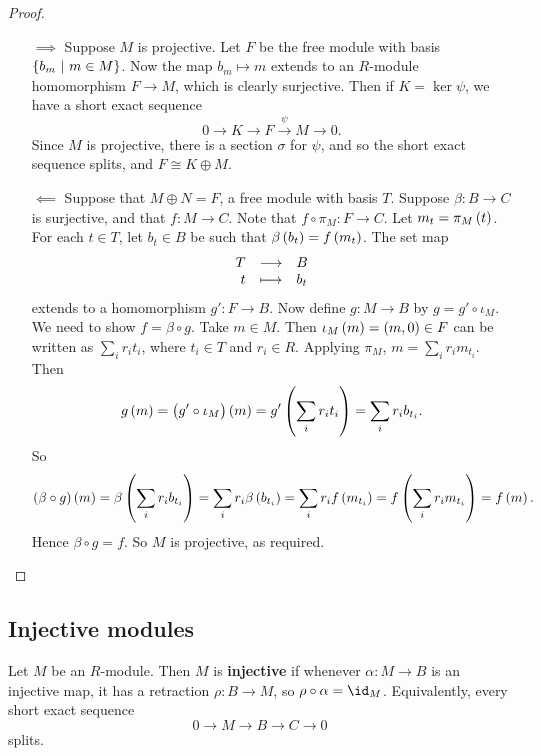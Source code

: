 \begin{proof}
\hfill
\begin{itemize}
\item[$ \implies $] Suppose $ M $ is projective. Let $ F $ be the free module with basis $ \cbr{b_m \st m \in M} $. Now the map $ b_m \mapsto m $ extends to an $ R $-module homomorphism $ F \to M $, which is clearly surjective. Then if $ K = \ker \psi $, we have a short exact sequence
$$ 0 \to K \to F \xrightarrow{\psi} M \to 0. $$
Since $ M $ is projective, there is a section $ \sigma $ for $ \psi $, and so the short exact sequence splits, and $ F \cong K \oplus M $.


\item[$ \impliedby $] Suppose that $ M \oplus N = F $, a free module with basis $ T $. Suppose $ \beta : B \to C $ is surjective, and that $ f : M \to C $. Note that $ f \circ \pi_M : F \to C $. Let $ m_t = \pi_M\br{t} $. For each $ t \in T $, let $ b_t \in B $ be such that $ \beta\br{b_t} = f\br{m_t} $. The set map
$$ \function{T}{B}{t}{b_t} $$
extends to a homomorphism $ g' : F \to B $. Now define $ g : M \to B $ by $ g = g' \circ \iota_M $. We need to show $ f = \beta \circ g $. Take $ m \in M $. Then $ \iota_M\br{m} = \br{m, 0} \in F $ can be written as $ \sum_i r_it_i $, where $ t_i \in T $ and $ r_i \in R $. Applying $ \pi_M $, $ m = \sum_i r_im_{t_i} $. Then
$$ g\br{m} = \br{g' \circ \iota_M}\br{m} = g'\br{\sum_i r_it_i} = \sum_i r_ib_{t_i}. $$
So
$$ \br{\beta \circ g}\br{m} = \beta\br{\sum_i r_ib_{t_i}} = \sum_i r_i\beta\br{b_{t_i}} = \sum_i r_if\br{m_{t_i}} = f\br{\sum_i r_im_{t_i}} = f\br{m}. $$
Hence $ \beta \circ g = f $. So $ M $ is projective, as required.
\end{itemize}
\end{proof}

\pagebreak

\subsection{Injective modules}

\begin{definition}
Let $ M $ be an $ R $-module. Then $ M $ is \textbf{injective} if whenever $ \alpha : M \to B $ is an injective map, it has a retraction $ \rho : B \to M $, so $ \rho \circ \alpha = \id_M $. Equivalently, every short exact sequence
$$ 0 \to M \to B \to C \to 0 $$
splits.
\end{definition}

